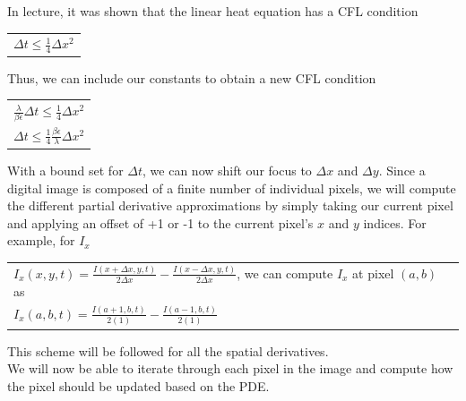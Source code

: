 \documentclass{article}
\begin{document}
  \noindent
  In lecture, it was shown that the linear heat equation has a CFL condition
  \begin{center}
    \begin{tabular}{l}
      $\Delta t \leq \frac{1}{4} \Delta x^2$
    \end{tabular}
  \end{center}

  \noindent
  Thus, we can include our constants to obtain a new CFL condition
  \begin{center}
    \begin{tabular}{l}
      \vspace{12pt}
      $\frac{\lambda}{\beta \epsilon} \Delta t \leq \frac{1}{4} \Delta x^2$\\
      $\Delta t \leq \frac{1}{4} \frac{\beta \epsilon}{\lambda} \Delta x^2$\\
    \end{tabular}
  \end{center}

  \newpage
  \noindent
  With a bound set for  $\Delta t$, we can now shift our focus to $\Delta x$ and $\Delta y$. Since
  a digital image is composed of a finite number of individual pixels, we will compute the different
  partial derivative approximations by simply taking our current pixel and applying an offset of
  +1 or -1 to the current pixel's $x$ and $y$ indices. For example, for $I_{x}$
  \begin{center}
    \begin{tabular}{l}
      $I_{x}(x,y,t) = \frac{I(x+\Delta x,y,t)}{2\Delta x} - \frac{I(x-\Delta x,y,t)}{2\Delta x}$, we can
      \vspace{12pt}
      compute $I_{x}$ at pixel $(a,b)$ as\\
      $I_{x}(a,b,t) = \frac{I(a+1,b,t)}{2(1)} - \frac{I(a-1,b,t)}{2(1)}$
    \end{tabular}
  \end{center}
  \noindent
  This scheme will be followed for all the spatial derivatives.\\

  \noindent
  We will now be able to iterate through each pixel in the image and compute how the pixel should
  be updated based on the PDE.

  \newpage
\end{document}
